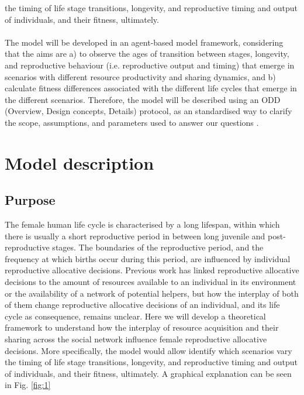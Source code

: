 \documentclass{article}
\begin{document}
the timing of life stage transitions, longevity, and reproductive timing and output of individuals, and their fitness, ultimately.
\\\\
The model will be developed in an agent-based model framework, considering that the aims are a) to observe the ages of transition between stages, longevity, and reproductive behaviour (i.e. reproductive output and timing) that emerge in scenarios with different resource productivity and sharing dynamics, and b) calculate fitness differences associated with the different life cycles that emerge in the different scenarios. Therefore, the model will be described using an ODD (Overview, Design concepts, Details) protocol, as an standardised way to clarify the scope, assumptions, and parameters used to answer our questions \citep{grimm2006standard,grimm2020odd}.

\section{Model description}

\subsection{Purpose}

The female human life cycle is characterised by a long lifespan, within which there is usually a short reproductive period in between long juvenile and post-reproductive stages. The boundaries of the reproductive period, and the frequency at which births occur during this period, are influenced by individual reproductive allocative decisions. Previous work has linked reproductive allocative decisions to the amount of resources available to an individual in its environment or the availability of a network of potential helpers, but how the interplay of both of them change reproductive allocative decisions of an individual, and its life cycle as consequence, remains unclear. Here we will develop a theoretical framework to understand how the interplay of resource acquisition and their sharing across the social network influence female reproductive allocative decisions. More specifically, the model would allow identify which scenarios vary the timing of life stage transitions, longevity, and reproductive timing and output of individuals, and their fitness, ultimately. A graphical explanation can be seen in Fig. \ref{fig:1}
\end{document}
